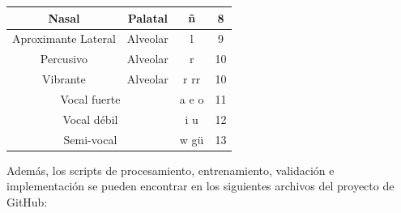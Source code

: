 \begin{table}[H]
\begin{tabular}{|c|c|c|c|}
	Nasal                                   & Palatal                                  & ñ                                 & 8                               \\ \hline
	Aproximante Lateral                     & Alveolar                                 & l                                 & 9                               \\ \hline
	Percusivo                               & Alveolar                                 & r                                 & 10                              \\ \hline
	Vibrante                                & Alveolar                                 & r rr                              & 10                              \\ \hline
	\multicolumn{2}{|c|}{Vocal fuerte}                                                 & a e o                             & 11                              \\ \hline
	\multicolumn{2}{|c|}{Vocal débil}                                                  & i u                               & 12                              \\ \hline
	\multicolumn{2}{|c|}{Semi-vocal}                                                   & w gü                              & 13                              \\ \hline
\end{tabular}
\end{table}

Además, los scripts de procesamiento, entrenamiento, validación e implementación se pueden encontrar en los siguientes archivos del proyecto de GitHub:

